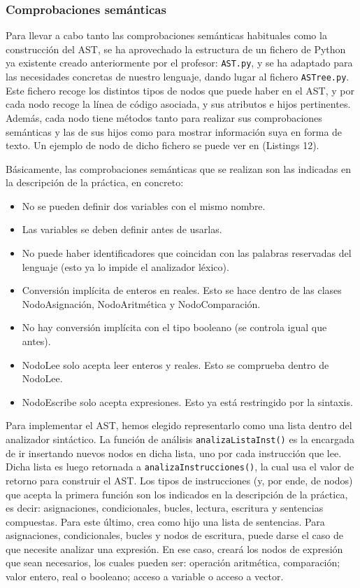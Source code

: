 \documentclass[11pt]{article}
\begin{document}
\subsubsection{Comprobaciones semánticas}
Para llevar a cabo tanto las comprobaciones semánticas habituales como la construcción del AST, se ha aprovechado la estructura de un fichero de Python ya existente creado anteriormente por el profesor: \lstinline[language=Python]{AST.py}, y se ha adaptado para las necesidades concretas de nuestro lenguaje, dando lugar al fichero \lstinline[language=Python]{ASTree.py}. Este fichero recoge los distintos tipos de nodos que puede haber en el AST, y por cada nodo recoge la línea de código asociada, y sus atributos e hijos pertinentes. Además, cada nodo tiene métodos tanto para realizar sus comprobaciones semánticas y las de sus hijos como para mostrar información suya en forma de texto. Un ejemplo de nodo de dicho fichero se puede ver en (Listings 12).

Básicamente, las comprobaciones semánticas que se realizan son las indicadas en la descripción de la práctica, en concreto:
\begin{itemize}
	\item No se pueden definir dos variables con el mismo nombre.
	\item Las variables se deben definir antes de usarlas.
	\item No puede haber identificadores que coincidan con las palabras reservadas del lenguaje (esto ya lo impide el analizador léxico).
	\item Conversión implícita de enteros en reales. Esto se hace dentro de las clases NodoAsignación, NodoAritmética y NodoComparación.
	\item No hay conversión implícita con el tipo booleano (se controla igual que antes).
	\item NodoLee solo acepta leer enteros y reales. Esto se comprueba dentro de NodoLee.
	\item NodoEscribe solo acepta expresiones. Esto ya está restringido por la sintaxis.
\end{itemize} 

Para implementar el AST, hemos elegido representarlo como una lista dentro del analizador sintáctico. La función de análisis \lstinline[language=Python]{analizaListaInst()} es la encargada de ir insertando nuevos nodos en dicha lista, uno por cada instrucción que lee. Dicha lista es luego retornada a \lstinline[language=Python]{analizaInstrucciones()}, la cual usa el valor de retorno para construir el AST. Los tipos de instrucciones (y, por ende, de nodos) que acepta la primera función son los indicados en la descripción de la práctica, es decir: asignaciones, condicionales, bucles, lectura, escritura y sentencias compuestas. Para este último, crea como hijo una lista de sentencias. Para asignaciones, condicionales, bucles y nodos de escritura, puede darse el caso de que necesite analizar una expresión. En ese caso, creará los nodos de expresión que sean necesarios, los cuales pueden ser: operación aritmética, comparación; valor entero, real o booleano; acceso a variable o acceso a vector.
\end{document}
